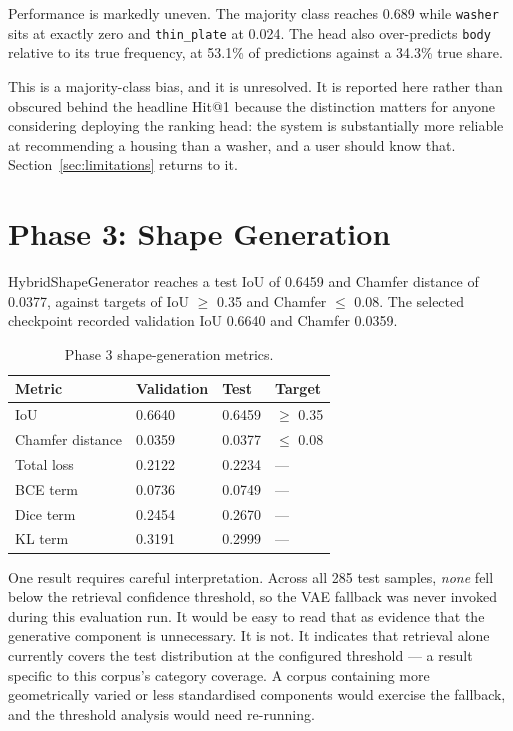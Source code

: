 \documentclass[12pt,oneside,a4paper]{report}
\begin{document}
Performance is markedly uneven. The majority class reaches 0.689 while
\texttt{washer} sits at exactly zero and \texttt{thin\_plate} at 0.024. The
head also over-predicts \texttt{body} relative to its true frequency, at
53.1\% of predictions against a 34.3\% true share.

This is a majority-class bias, and it is unresolved. It is reported here
rather than obscured behind the headline Hit@1 because the distinction
matters for anyone considering deploying the ranking head: the system is
substantially more reliable at recommending a housing than a washer, and a
user should know that. Section~\ref{sec:limitations} returns to it.

\section{Phase 3: Shape Generation}

HybridShapeGenerator reaches a test IoU of 0.6459 and Chamfer distance of
0.0377, against targets of IoU $\geq$ 0.35 and Chamfer $\leq$ 0.08. The
selected checkpoint recorded validation IoU 0.6640 and Chamfer 0.0359.

\begin{table}[h]
\centering
\caption{Phase 3 shape-generation metrics.}
\label{tab:phase3}
\small
\begin{tabularx}{\textwidth}{@{}L{4.6cm}C{2.8cm}C{2.8cm}X@{}}
\toprule
\textbf{Metric} & \textbf{Validation} & \textbf{Test} & \textbf{Target} \\
\midrule
IoU              & 0.6640 & 0.6459 & $\geq$ 0.35 \\
Chamfer distance & 0.0359 & 0.0377 & $\leq$ 0.08 \\
Total loss       & 0.2122 & 0.2234 & --- \\
\quad BCE term   & 0.0736 & 0.0749 & --- \\
\quad Dice term  & 0.2454 & 0.2670 & --- \\
\quad KL term    & 0.3191 & 0.2999 & --- \\
\bottomrule
\end{tabularx}
\end{table}

One result requires careful interpretation. Across all 285 test samples,
\emph{none} fell below the retrieval confidence threshold, so the VAE
fallback was never invoked during this evaluation run. It would be easy to
read that as evidence that the generative component is unnecessary. It is
not. It indicates that retrieval alone currently covers the test distribution
at the configured threshold --- a result specific to this corpus's category
coverage. A corpus containing more geometrically varied or less standardised
components would exercise the fallback, and the threshold analysis would need
re-running.
\end{document}
